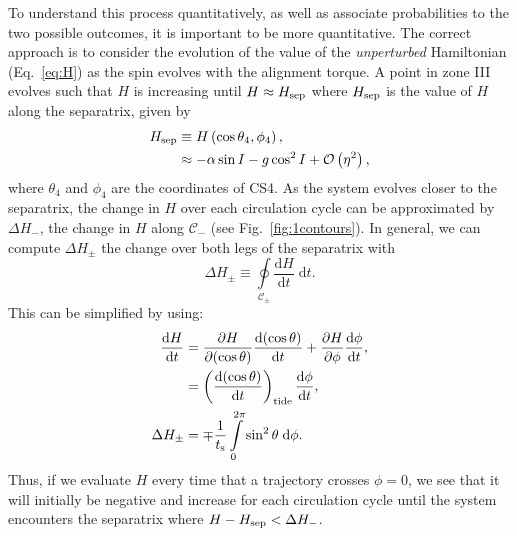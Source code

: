 \documentclass[
        fleqn,
        usenatbib,
    ]{mnras}
\newcommand*{\rd}[2]{\frac{\mathrm{d}#1}{\mathrm{d}#2}}
\newcommand*{\pd}[2]{\frac{\partial#1}{\partial#2}}
\newcommand*{\p}[1]{\left(#1\right)}
\begin{document}
To understand this process quantitatively, as well as associate probabilities to
the two possible outcomes, it is important to be more quantitative. The correct
approach is to consider the evolution of the value of the \emph{unperturbed}
Hamiltonian (Eq.~\ref{eq:H}) as the spin evolves with the alignment torque. A
point in zone III evolves such that $H$ is increasing until $H \approx H_{\rm
sep}$ where $H_{\rm sep}$ is the value of $H$ along the separatrix, given by
\begin{align}
    H_{\rm sep} &\equiv H\p{\cos \theta_{\rm 4}, \phi_{\rm 4}},\nonumber\\
        &\approx -\alpha\sin I - g\cos^2 I +
            \mathcal{O}\p{\eta^2},\label{eq:def_Hsep}
\end{align}
where $\theta_4$ and $\phi_4$ are the coordinates of CS4. As the system evolves
closer to the separatrix, the change in $H$ over each circulation cycle can be
approximated by $\Delta H_-$, the change in $H$ along $\mathcal{C}_-$ (see
Fig.~\ref{fig:1contours}). In general, we can compute $\Delta H_{\pm}$ the
change over both legs of the separatrix with
\begin{equation}
    \Delta H_{\pm} \equiv \oint\limits_{\mathcal{C}_{\pm}}
        \rd{H}{t}\;\mathrm{d}t.\label{eq:def_dHpm}
\end{equation}
This can be simplified by using:
\begin{align}
    \rd{H}{t} &=
            \pd{H}{(\cos \theta)}\rd{(\cos \theta)}{t}
            + \pd{H}{\phi}\rd{\phi}{t},\nonumber\\
        &= \p{\rd{(\cos\theta)}{t}}_{\rm tide} \rd{\phi}{t},\\
    \Delta H_{\pm} &= \mp\frac{1}{t_{\rm s}}
        \int\limits_0^{2\pi} \sin^2\theta\;\mathrm{d}\phi.
\end{align}
Thus, if we evaluate $H$ every time that a trajectory crosses $\phi = 0$, we see
that it will initially be negative and increase for each circulation cycle until
the system encounters the separatrix where $H - H_{\rm sep} < \Delta H_-$.
\end{document}

